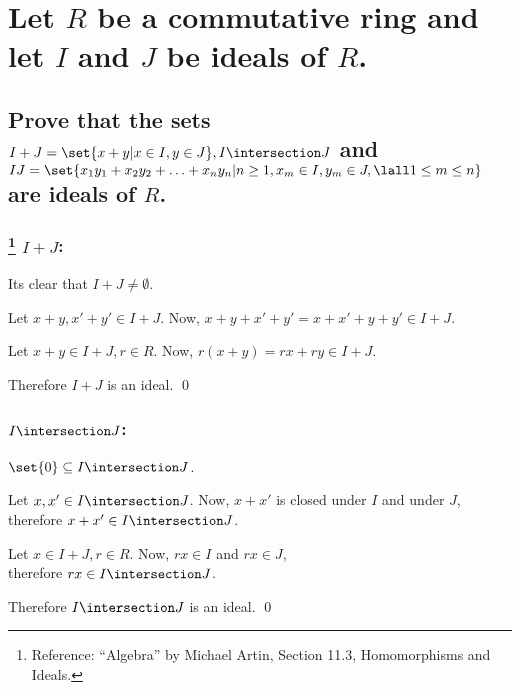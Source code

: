 \section[Problem 1]{Let $R$ be a commutative ring and let $I$ and $J$ be ideals of $R$.}
    \subsection[(i)]{Prove that the sets $I + J = \set{x + y | x\in I, y \in J}, I \intersection J$
        and \\
        \(
            IJ = 
            \set{x_1y_1+ x_2y_2 +\hdots + x_n y_n 
            | n \geq 1, x_m \in I, y_m \in J, \lall 1 \leq m \leq n}
        \) 
        are ideals of $R$.
    }
        \begin{multicols}{3}
            \subsubsection[Addition]{
                \footnote{Reference: “Algebra” by Michael Artin, Section 11.3, Homomorphisms and Ideals.}
                $I + J$:
            }

                Its clear that $I+J \neq \emptyset$.

                Let $x +y, x'+y' \in I+J$.
                Now, $x + y + x' + y' = x+x' + y+y' \in I+J$.

                Let $x + y \in I+J, r \in R$.
                Now, $r(x+y) = rx + ry \in I +J$.

                Therefore $I+J$ is an ideal.
                \qed
            
            \subsubsection[Intersection]{$I \intersection J$:}

                $\set{0} \subseteq I \intersection J$.

                Let $x, x' \in I \intersection J$.
                Now, $x + x'$ is closed under $I$ and under $J$, therefore $x+x' \in I \intersection J$.

                Let $x \in I+J, r \in R$.
                Now, $rx \in I$ and $rx \in J$, \\
                therefore $rx \in I \intersection J$.
                
                Therefore $I \intersection J$ is an ideal.
                \qed


\end{multicols}

